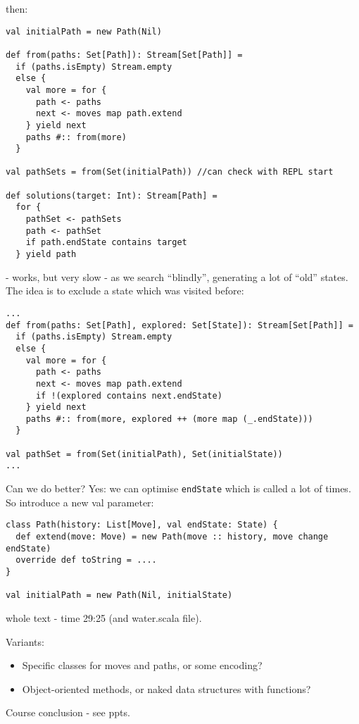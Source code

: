 \documentclass{scrartcl}
\begin{document}
then:
\begin{lstlisting}
val initialPath = new Path(Nil)

def from(paths: Set[Path]): Stream[Set[Path]] = 
  if (paths.isEmpty) Stream.empty
  else {
    val more = for {
      path <- paths
      next <- moves map path.extend
    } yield next
    paths #:: from(more)
  }

val pathSets = from(Set(initialPath)) //can check with REPL start

def solutions(target: Int): Stream[Path] = 
  for {
    pathSet <- pathSets
    path <- pathSet
    if path.endState contains target
  } yield path
\end{lstlisting}
- works, but very slow - as we search ``blindly'', generating a lot of ``old''
states. The idea is to exclude a state which was visited before:
\begin{lstlisting}
...
def from(paths: Set[Path], explored: Set[State]): Stream[Set[Path]] = 
  if (paths.isEmpty) Stream.empty
  else {
    val more = for {
      path <- paths
      next <- moves map path.extend
      if !(explored contains next.endState)
    } yield next
    paths #:: from(more, explored ++ (more map (_.endState)))
  } 

val pathSet = from(Set(initialPath), Set(initialState))
...
\end{lstlisting}
Can we do better? Yes: we can optimise \lstinline|endState| which is called a
lot of times. So introduce a new val parameter:
\begin{lstlisting}
class Path(history: List[Move], val endState: State) {
  def extend(move: Move) = new Path(move :: history, move change endState)
  override def toString = ....
}

val initialPath = new Path(Nil, initialState)
\end{lstlisting}
whole text - time 29:25 (and water.scala file).

Variants:
\begin{itemize}
\item Specific classes for moves and paths, or some encoding?
\item Object-oriented methods, or naked data structures with functions?
\end{itemize}

Course conclusion - see ppts.
\end{document}
